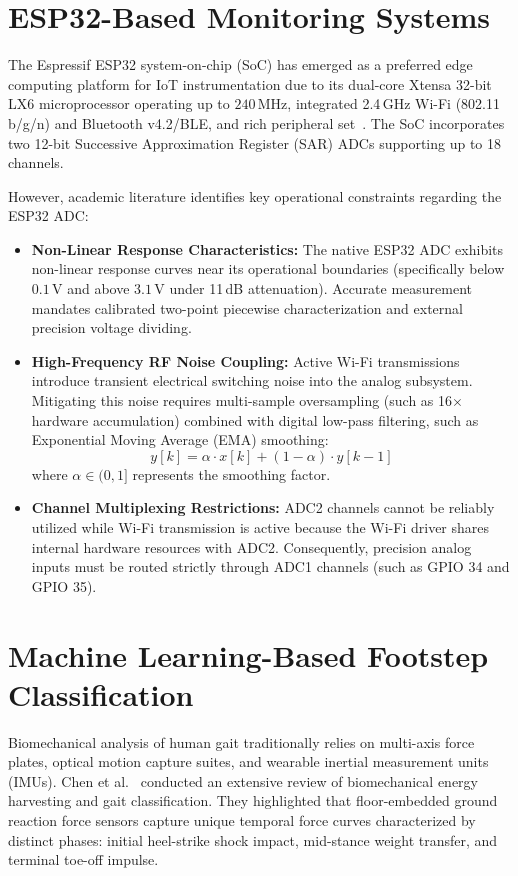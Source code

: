 \section{ESP32-Based Monitoring Systems}
The Espressif ESP32 system-on-chip (SoC) has emerged as a preferred edge computing platform for IoT instrumentation due to its dual-core Xtensa 32-bit LX6 microprocessor operating up to $240\,\text{MHz}$, integrated 2.4\,GHz Wi-Fi (802.11 b/g/n) and Bluetooth v4.2/BLE, and rich peripheral set~\cite{espressif2023esp32}. The SoC incorporates two 12-bit Successive Approximation Register (SAR) ADCs supporting up to 18 channels.

However, academic literature identifies key operational constraints regarding the ESP32 ADC:
\begin{itemize}
    \item \textbf{Non-Linear Response Characteristics:} The native ESP32 ADC exhibits non-linear response curves near its operational boundaries (specifically below $0.1\,\text{V}$ and above $3.1\,\text{V}$ under 11\,dB attenuation). Accurate measurement mandates calibrated two-point piecewise characterization and external precision voltage dividing.
    \item \textbf{High-Frequency RF Noise Coupling:} Active Wi-Fi transmissions introduce transient electrical switching noise into the analog subsystem. Mitigating this noise requires multi-sample oversampling (such as 16$\times$ hardware accumulation) combined with digital low-pass filtering, such as Exponential Moving Average (EMA) smoothing:
    \begin{equation}
    y[k] = \alpha \cdot x[k] + (1 - \alpha) \cdot y[k-1]
    \label{eq:ema_formula}
    \end{equation}
    where $\alpha \in (0, 1]$ represents the smoothing factor.
    \item \textbf{Channel Multiplexing Restrictions:} ADC2 channels cannot be reliably utilized while Wi-Fi transmission is active because the Wi-Fi driver shares internal hardware resources with ADC2. Consequently, precision analog inputs must be routed strictly through ADC1 channels (such as GPIO 34 and GPIO 35).
\end{itemize}

\section{Machine Learning-Based Footstep Classification}
Biomechanical analysis of human gait traditionally relies on multi-axis force plates, optical motion capture suites, and wearable inertial measurement units (IMUs). Chen et al.~\cite{chen2019gait} conducted an extensive review of biomechanical energy harvesting and gait classification. They highlighted that floor-embedded ground reaction force sensors capture unique temporal force curves characterized by distinct phases: initial heel-strike shock impact, mid-stance weight transfer, and terminal toe-off impulse.

